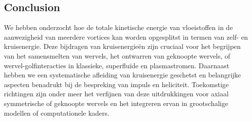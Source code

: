 \subsection*{Conclusion}
We hebben onderzocht hoe de totale kinetische energie van vloeistoffen in de aanwezigheid van meerdere
vortices kan worden opgesplitst in termen van zelf- en kruisenergie. Deze bijdragen van kruisenergieën
zijn cruciaal voor het begrijpen van het samensmelten van wervels, het ontwarren van geknoopte wervels, of wervel-golfinteracties in klassieke, superfluïde en plasmastromen. Daarnaast hebben we een systematische afleiding van kruisenergie geschetst en
belangrijke aspecten benadrukt bij de bespreking van impuls en heliciteit. Toekomstige richtingen
zijn onder meer het verfijnen van deze uitdrukkingen voor axiaal symmetrische of geknoopte wervels en
het integreren ervan in grootschalige modellen of computationele kaders.